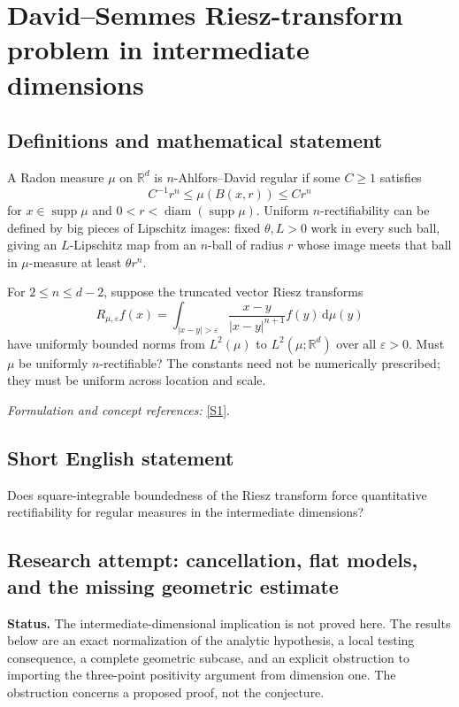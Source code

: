 \documentclass[11pt]{article}
\begin{document}
\section*{\texorpdfstring{David–Semmes Riesz-transform problem in intermediate dimensions}{David–Semmes Riesz-transform problem in intermediate dimensions}}\label{30006957}
\subsection{Definitions and mathematical statement}
A Radon measure $\mu$ on ${\mathbb{R}}^d$ is $n$-Ahlfors--David regular if some $C\ge1$ satisfies
\[
 C^{-1}r^n\le\mu(B(x,r))\le Cr^n
\]
for $x\in\operatorname{supp}\mu$ and $0<r<\operatorname{diam}(\operatorname{supp}\mu)$. Uniform $n$-rectifiability can be defined by big pieces of Lipschitz images: fixed $\theta,L>0$ work in every such ball, giving an $L$-Lipschitz map from an $n$-ball of radius $r$ whose image meets that ball in $\mu$-measure at least $\theta r^n$.

For $2\le n\le d-2$, suppose the truncated vector Riesz transforms
\[
 R_{\mu,{\varepsilon}}f(x)=\int_{|x-y|>{\varepsilon}}
 \frac{x-y}{|x-y|^{n+1}}f(y){\,\mathrm{d}}\mu(y)
\]
have uniformly bounded norms from $L^2(\mu)$ to $L^2(\mu;{\mathbb{R}}^d)$ over all ${\varepsilon}>0$. Must $\mu$ be uniformly $n$-rectifiable? The constants need not be numerically prescribed; they must be uniform across location and scale.
\par\smallskip\textit{Formulation and concept references:} \href{https://arxiv.org/html/2509.26547}{[S1]}.

\subsection{Short English statement}
Does square-integrable boundedness of the Riesz transform force quantitative rectifiability for regular measures in the intermediate dimensions?
\subsection{Research attempt: cancellation, flat models, and the missing geometric estimate}
\textbf{Status.} The intermediate-dimensional implication is not proved here. The results below are an exact normalization of the analytic hypothesis, a local testing consequence, a complete geometric subcase, and an explicit obstruction to importing the three-point positivity argument from dimension one. The obstruction concerns a proposed proof, not the conjecture.
\end{document}
